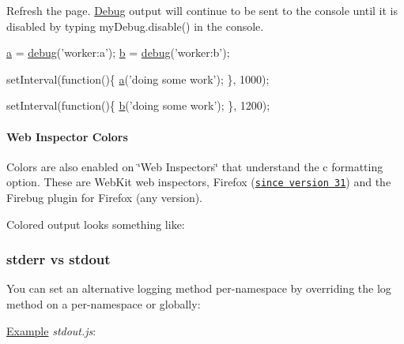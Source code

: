 Refresh the page. \hyperlink{class_debug}{Debug} output will continue to be sent to the console until it is disabled by typing {\ttfamily my\+Debug.\+disable()} in the console.


\begin{DoxyCode}
\hyperlink{058__bracket__recursion_8tcl_ab08ae027fc5777bc4f0629f1b60b35db}{a} = \hyperlink{addon_2doxmlparser_2src_2debug_8cpp_a0a777024bcc965d6200d9599eb187cd9}{debug}(\textcolor{stringliteral}{'worker:a'});
\hyperlink{058__bracket__recursion_8tcl_a68bdb74c144118d936931c46f75d4b3e}{b} = \hyperlink{addon_2doxmlparser_2src_2debug_8cpp_a0a777024bcc965d6200d9599eb187cd9}{debug}(\textcolor{stringliteral}{'worker:b'});

setInterval(\textcolor{keyword}{function}()\{
  \hyperlink{058__bracket__recursion_8tcl_ab08ae027fc5777bc4f0629f1b60b35db}{a}(\textcolor{stringliteral}{'doing some work'});
\}, 1000);

setInterval(\textcolor{keyword}{function}()\{
  \hyperlink{058__bracket__recursion_8tcl_a68bdb74c144118d936931c46f75d4b3e}{b}(\textcolor{stringliteral}{'doing some work'});
\}, 1200);
\end{DoxyCode}


\paragraph*{Web Inspector Colors}

Colors are also enabled on \char`\"{}\+Web Inspectors\char`\"{} that understand the {\ttfamily c} formatting option. These are Web\+Kit web inspectors, Firefox (\href{https://hacks.mozilla.org/2014/05/editable-box-model-multiple-selection-sublime-text-keys-much-more-firefox-developer-tools-episode-31/}{\tt since version 31}) and the Firebug plugin for Firefox (any version).

Colored output looks something like\+:



\subsubsection*{stderr vs stdout}

You can set an alternative logging method per-\/namespace by overriding the {\ttfamily log} method on a per-\/namespace or globally\+:

\hyperlink{struct_example}{Example} {\itshape stdout.\+js}\+:


